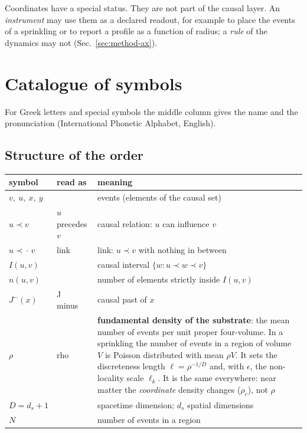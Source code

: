 Coordinates have a special status. They are not part of the causal layer. An \emph{instrument} may
use them as a declared readout, for example to place the events of a sprinkling or to report a
profile as a function of radius; a \emph{rule} of the dynamics may not (Sec.~\ref{sec:method-ax}).

\section{Catalogue of symbols}\label{sec:symbols}

For Greek letters and special symbols the middle column gives the name and the pronunciation
(International Phonetic Alphabet, English).

\newcommand{\rd}[2]{#1~\textipa{/#2/}}
\newenvironment{symtab}{\begin{center}\small\begin{tabular}{l>{\raggedright\arraybackslash}p{4.0cm}>{\raggedright\arraybackslash}p{7.4cm}}
\toprule symbol & read as & meaning\\\midrule}{\bottomrule\end{tabular}\end{center}}

\subsection{Structure of the order}

\begin{symtab}
$v,\ u,\ x,\ y$ & & events (elements of the causal set)\\
$u\prec v$ & \rd{$u$ precedes $v$}{prI"si:dz} & causal relation: $u$ can influence $v$\\
$u\prec\!\!\cdot\, v$ & \rd{link}{lINk} & link: $u\prec v$ with nothing in between\\
$I(u,v)$ & & causal interval $\{w:u\prec w\prec v\}$\\
$n(u,v)$ & & number of elements strictly inside $I(u,v)$\\
$J^-(x)$ & \rd{J minus}{dZeI "maIn@s} & causal past of $x$\\
$\rho$ & \rd{rho}{roU} & \textbf{fundamental density of the substrate}: the mean number of events per unit
  proper four-volume. In a sprinkling the number of events in a region of volume $V$ is Poisson
  distributed with mean $\rho V$. It sets the discreteness length $\ell=\rho^{-1/D}$ and, with
  $\epsilon$, the non-locality scale $\ell_k$. It is the same everywhere: near matter the
  \emph{coordinate} density changes ($\rho_c$), not $\rho$\\
$D=d_s+1$ & & spacetime dimension; $d_s$ spatial dimensions\\
$N$ & & number of events in a region\\
\end{symtab}

